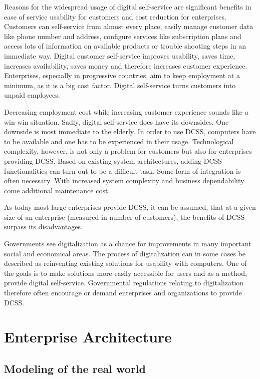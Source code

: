 \documentclass[
     12pt,         %
     a4paper,      %
     BCOR=10mm,version=first,     %
     DIV=14,version=first,        %
     ]{scrreprt}
\begin{document}
Reasons for the widespread usage of digital self-service are significant benefits in ease of service usability for customers and cost reduction for enterprises. Customers can self-service from almost every place, easily manage customer data like phone number and address, configure services like subscription plans and access lots of information on available products or trouble shooting steps in an immediate way. Digital customer self-service improves usability, saves time, increases availability, saves money and therefore increases customer experience.
Enterprises, especially in progressive countries, aim to keep employment at a minimum, as it is a big cost factor. Digital self-service turns customers into unpaid employees.

Decreasing employment cost while increasing customer experience sounds like a win-win situation. Sadly, digital self-service does have its downsides. One downside is most immediate to the elderly. In order to use DCSS, computers have to be available and one has to be experienced in their usage. Technological complexity, however, is not only a problem for customers but also for enterprises providing DCSS. Based on existing system architectures, adding DCSS functionalities can turn out to be a difficult task. Some form of integration is often necessary. With increased system complexity and business dependability come additional maintenance cost.

As today most large enterprises provide DCSS, it can be assumed, that at a given size of an enterprise (measured in number of customers), the benefits of DCSS surpass its disadvantages.

Governments see digitalization as a chance for improvements in many important social and economical areas. The process of digitalization can in some cases be described as reinventing existing solutions for usability with computers. One of the goals is to make solutions more easily accessible for users and as a method, provide digital self-service. Governmental regulations relating to digitalization therefore often encourage or demand enterprises and organizations to provide DCSS.

\section{Enterprise Architecture}

\subsection{Modeling of the real world}
\end{document}
